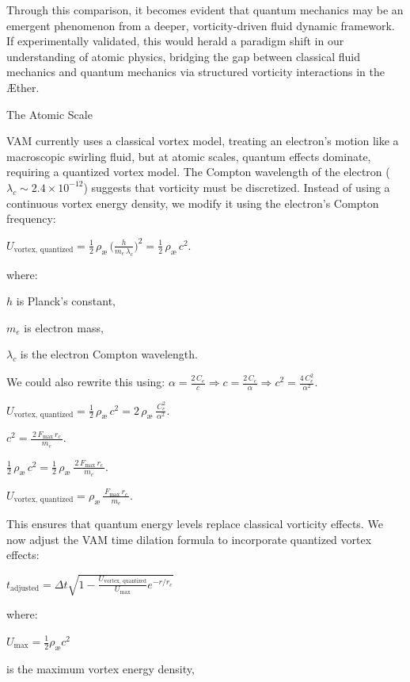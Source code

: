 \documentclass[a4paper,10pt]{article}
\begin{document}
Through this comparison, it becomes evident that quantum mechanics may be an emergent phenomenon from a deeper, vorticity-driven fluid dynamic framework. If experimentally validated, this would herald a paradigm shift in our understanding of atomic physics, bridging the gap between classical fluid mechanics and quantum mechanics via structured vorticity interactions in the Æther.

    The Atomic Scale

VAM currently uses a classical vortex model, treating an electron's motion like a macroscopic swirling fluid, but at atomic scales, quantum effects dominate, requiring a quantized vortex model. The Compton wavelength of the electron ($\lambda_c \sim 2.4 \times 10^{-12}$) suggests that vorticity must be discretized. Instead of using a continuous vortex energy density, we modify it using the electron's Compton frequency:

$U_\text{vortex, quantized}= \tfrac12\,\rho_\text{\ae}\,\bigl(\tfrac{h}{m_e\,\lambda_c}\bigr)^2= \tfrac12\,\rho_\text{\ae}\,c^2.$

where:

$h$ is Planck's constant,

$m_e$ is electron mass,

$\lambda_c$ is the electron Compton wavelength.

We could also rewrite this using: 
$\alpha= \tfrac{2\,C_e}{c}\Rightarrow c= \tfrac{2\,C_e}{\alpha}\Rightarrow c^2= \tfrac{4\,C_e^{2}}{\alpha^{2}}.$

$U_\text{vortex, quantized}= \tfrac12\,\rho_\text{\ae}\,c^2= 2\,\rho_\text{\ae}\,\frac{\,C_e^{2}}{\alpha^{2}}.$

$c^2= \frac{\,2\,F_{\max}\,r_c\,}{\,m_{e}\,}.$

$ \tfrac12\,\rho_\text{\ae}\,c^2= \tfrac12\,\rho_\text{\ae}\,\frac{\,2\,F_{\max}\,r_c\,}{\,m_{e}\,}.$

$U_\text{vortex, quantized}= \rho_\text{\ae}\,\frac{\,F_{\max}\,r_c\,}{\,m_{e}\,}.$

This ensures that quantum energy levels replace classical vorticity effects. We now adjust the VAM time dilation formula to incorporate quantized vortex effects:

$\boxed{t_\text{adjusted} = \Delta t \sqrt{1 - \frac{U_\text{vortex, quantized}}{U_\text{max}} e^{-r/r_c}}}$

where:

$U_\text{max} = \frac{1}{2} \rho_\text{\ae} c^2$

is the maximum vortex energy density,
\end{document}
